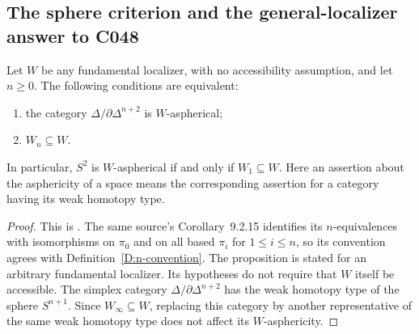 \subsection{The sphere criterion and the general-localizer answer to C048}

\begin{proposition}\label{F:sphere-localizer}
Let $W$ be any fundamental localizer, with no accessibility assumption,
and let $n\geq0$. The following conditions are equivalent:
\begin{enumerate}
\item the category $\Delta/\partial\Delta^{n+2}$ is $W$-aspherical;
\item $W_n\subseteq W$.
\end{enumerate}
In particular, $S^2$ is $W$-aspherical if and only if $W_1\subseteq W$.
Here an assertion about the asphericity of a space means the
corresponding assertion for a category having its weak homotopy type.
\end{proposition}
\begin{proof}
This is \citet[Proposition~9.2.17, equivalence (a)--(b), pp.~369--370]{Cisinski2006Prefaisceaux}.
The same source's Corollary~9.2.15 identifies its $n$-equivalences with
isomorphisms on $\pi_0$ and on all based $\pi_i$ for $1\leq i\leq n$,
so its convention agrees with Definition~\ref{D:n-convention}.
The proposition is stated for an arbitrary fundamental localizer.
Its hypotheses do not require that $W$ itself be accessible.
The simplex category $\Delta/\partial\Delta^{n+2}$ has the weak
homotopy type of the sphere $S^{n+1}$. Since
$W_\infty\subseteq W$, replacing this category by another representative
of the same weak homotopy type does not affect its $W$-asphericity.
\end{proof}

